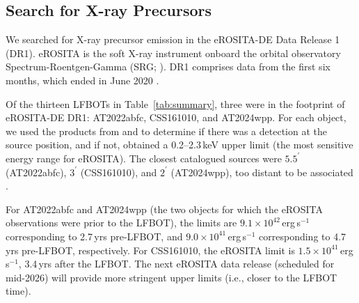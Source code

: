 \documentclass[twocolumn,twocolappendix, linenumbers, trackchanges]{aastex7}
\begin{document}
\subsection{Search for X-ray Precursors}

 We searched for X-ray precursor emission in the eROSITA-DE Data Release 1 (DR1). eROSITA \citep{eROSITA} is the soft X-ray instrument onboard the orbital observatory Spectrum-Roentgen-Gamma (SRG; \citealt{SRG2021}). DR1 comprises data from the first six months, which ended in June 2020 \citep{Merloni2024,TubinArenas2024}.  

Of the thirteen LFBOTs in Table~\ref{tab:summary}, three were in the footprint of eROSITA-DE DR1: AT2022abfc, CSS161010, and AT2024wpp. For each object, we used the products from \citet{TubinArenas2024} and \citet{Merloni2024} to determine if there was a detection at the source position, and if not, obtained a 0.2--2.3\,keV upper limit (the most sensitive energy range for eROSITA).    The closest catalogued sources were  $5.5^{\prime}$ (AT2022abfc), $3^{\prime}$ (CSS161010), and $2^{\prime}$ (AT2024wpp), too distant to be associated .

For AT2022abfc and AT2024wpp (the two objects for which the eROSITA observations were prior to the LFBOT), the limits are $9.1\times10^{42}$\,erg\,s$^{-1}$ corresponding to 2.7\,yrs pre-LFBOT, and $9.0\times10^{41}$\,erg\,s$^{-1}$ corresponding to 4.7\,yrs pre-LFBOT, respectively. For CSS161010, the eROSITA limit is $1.5\times10^{41}$\,erg\,s$^{-1}$, 3.4\,yrs after the LFBOT. The next eROSITA data release (scheduled for mid-2026) will provide more stringent upper limits (i.e., closer to the LFBOT time).  
\end{document}
